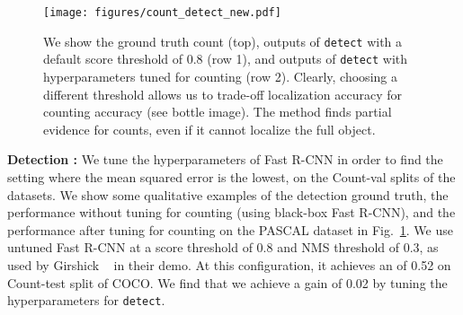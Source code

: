 \documentclass[10pt,twocolumn,letterpaper]{article}
\newcommand{\detect}{\texttt{detect}\xspace}
\newcommand{\glance}{\texttt{glance}\xspace}
\newcommand{\pascal}{PASCAL\xspace}
\begin{document}
\begin{figure}[t]
\centering     \texttt{[image: figures/count\_detect\_new.pdf]}
\vspace{-15pt}
\caption{\footnotesize{We show the ground truth count (top), outputs of \detect{} with a default score threshold of 0.8 (row 1), and outputs of \detect{} with hyperparameters tuned for counting (row 2). Clearly, choosing a different threshold allows us to trade-off localization accuracy for counting accuracy (see bottle image). The method finds partial evidence for counts, even if it cannot localize the full object.}}
\label{fig:b}
\vspace{-10pt}
\end{figure}
\par \noindent
\textbf{Detection : }We tune the hyperparameters of Fast R-CNN in order to find the setting where the mean squared error is the lowest, on the Count-val splits of the datasets. We show some qualitative examples of the detection ground truth, the performance without tuning for counting (using black-box Fast R-CNN), and the performance after tuning for counting on the \pascal dataset in  Fig.~\ref{fig:b}. We use untuned Fast R-CNN at a score threshold of 0.8 and NMS threshold of 0.3, as used by Girshick \etal~\cite{Girshick2015FastR-CNN} in their demo. At this configuration, it achieves an  of 0.52 on Count-test split of COCO. We find that we achieve a gain of 0.02  by tuning the hyperparameters for \detect{}.
\begin{comment}
\begin{table} \footnotesize
\setlength{\tabcolsep}{5.5pt}
\begin{center}
\begin{tabular}{@{} l  c  c c @{}}
\toprule
Approach & mRMSE & mRMSE\\
\midrule
\glance{}\texttt{-fn-1L} & 0.53 & 0.13\\
\glance{}\texttt{-fn-2L} & 0.52 & 0.11\\
\glance{}\texttt{-nofn-1L} & 0.50 & 0.11\\
\glance{}\texttt{-nofn-2L} & 0.50 & 0.11\\
\bottomrule
\end{tabular}
\caption{mRMSE and m-relRMSE(count-MRMSE) , as well as their non-zero variants, of various methods for counting on second half of COCO VAL dataset. \textbf{Lower} is better.}
\label{table:sub}
\vspace{-8pt}
\end{center}
\end{table}
\end{comment}
\end{document}
